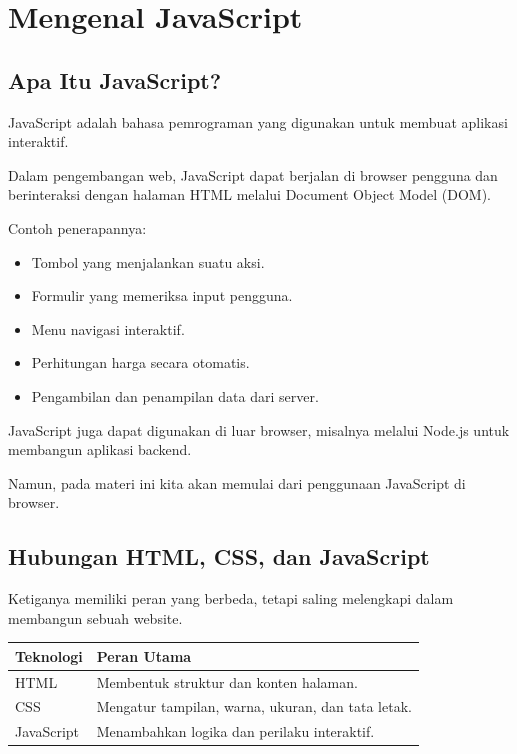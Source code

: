 \documentclass[12pt,a4paper]{article}
\begin{document}
\section{Mengenal JavaScript}

\subsection{Apa Itu JavaScript?}

JavaScript adalah bahasa pemrograman yang digunakan
untuk membuat aplikasi interaktif.

Dalam pengembangan web, JavaScript dapat berjalan
di browser pengguna dan berinteraksi dengan halaman
HTML melalui Document Object Model (DOM).

Contoh penerapannya:

\begin{itemize}
    \item Tombol yang menjalankan suatu aksi.
    \item Formulir yang memeriksa input pengguna.
    \item Menu navigasi interaktif.
    \item Perhitungan harga secara otomatis.
    \item Pengambilan dan penampilan data dari server.
\end{itemize}

JavaScript juga dapat digunakan di luar browser,
misalnya melalui Node.js untuk membangun aplikasi
backend.

Namun, pada materi ini kita akan memulai dari
penggunaan JavaScript di browser.

\subsection{Hubungan HTML, CSS, dan JavaScript}

Ketiganya memiliki peran yang berbeda, tetapi saling
melengkapi dalam membangun sebuah website.

\begin{center}
\begin{tabularx}{\textwidth}{lX}
\toprule
\textbf{Teknologi} & \textbf{Peran Utama} \\
\midrule
HTML & Membentuk struktur dan konten halaman. \\
CSS & Mengatur tampilan, warna, ukuran, dan tata letak. \\
JavaScript & Menambahkan logika dan perilaku interaktif. \\
\bottomrule
\end{tabularx}
\end{center}
\end{document}
